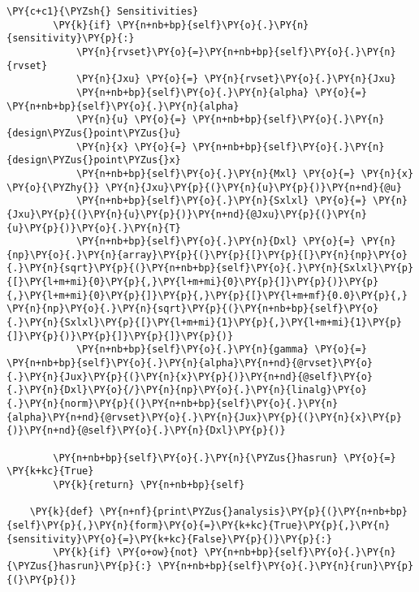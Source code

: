 \begin{tcolorbox}[breakable, size=fbox, boxrule=1pt, pad at break*=1mm,colback=cellbackground, colframe=cellborder]
\begin{Verbatim}[commandchars=\\\{\}]
        \PY{c+c1}{\PYZsh{} Sensitivities}
        \PY{k}{if} \PY{n+nb+bp}{self}\PY{o}{.}\PY{n}{sensitivity}\PY{p}{:}
            \PY{n}{rvset}\PY{o}{=}\PY{n+nb+bp}{self}\PY{o}{.}\PY{n}{rvset}
            \PY{n}{Jxu} \PY{o}{=} \PY{n}{rvset}\PY{o}{.}\PY{n}{Jxu}
            \PY{n+nb+bp}{self}\PY{o}{.}\PY{n}{alpha} \PY{o}{=} \PY{n+nb+bp}{self}\PY{o}{.}\PY{n}{alpha}
            \PY{n}{u} \PY{o}{=} \PY{n+nb+bp}{self}\PY{o}{.}\PY{n}{design\PYZus{}point\PYZus{}u} 
            \PY{n}{x} \PY{o}{=} \PY{n+nb+bp}{self}\PY{o}{.}\PY{n}{design\PYZus{}point\PYZus{}x}
            \PY{n+nb+bp}{self}\PY{o}{.}\PY{n}{Mxl} \PY{o}{=} \PY{n}{x} \PY{o}{\PYZhy{}} \PY{n}{Jxu}\PY{p}{(}\PY{n}{u}\PY{p}{)}\PY{n+nd}{@u}
            \PY{n+nb+bp}{self}\PY{o}{.}\PY{n}{Sxlxl} \PY{o}{=} \PY{n}{Jxu}\PY{p}{(}\PY{n}{u}\PY{p}{)}\PY{n+nd}{@Jxu}\PY{p}{(}\PY{n}{u}\PY{p}{)}\PY{o}{.}\PY{n}{T}
            \PY{n+nb+bp}{self}\PY{o}{.}\PY{n}{Dxl} \PY{o}{=} \PY{n}{np}\PY{o}{.}\PY{n}{array}\PY{p}{(}\PY{p}{[}\PY{p}{[}\PY{n}{np}\PY{o}{.}\PY{n}{sqrt}\PY{p}{(}\PY{n+nb+bp}{self}\PY{o}{.}\PY{n}{Sxlxl}\PY{p}{[}\PY{l+m+mi}{0}\PY{p}{,}\PY{l+m+mi}{0}\PY{p}{]}\PY{p}{)}\PY{p}{,}\PY{l+m+mi}{0}\PY{p}{]}\PY{p}{,}\PY{p}{[}\PY{l+m+mf}{0.0}\PY{p}{,} \PY{n}{np}\PY{o}{.}\PY{n}{sqrt}\PY{p}{(}\PY{n+nb+bp}{self}\PY{o}{.}\PY{n}{Sxlxl}\PY{p}{[}\PY{l+m+mi}{1}\PY{p}{,}\PY{l+m+mi}{1}\PY{p}{]}\PY{p}{)}\PY{p}{]}\PY{p}{]}\PY{p}{)}
            \PY{n+nb+bp}{self}\PY{o}{.}\PY{n}{gamma} \PY{o}{=} \PY{n+nb+bp}{self}\PY{o}{.}\PY{n}{alpha}\PY{n+nd}{@rvset}\PY{o}{.}\PY{n}{Jux}\PY{p}{(}\PY{n}{x}\PY{p}{)}\PY{n+nd}{@self}\PY{o}{.}\PY{n}{Dxl}\PY{o}{/}\PY{n}{np}\PY{o}{.}\PY{n}{linalg}\PY{o}{.}\PY{n}{norm}\PY{p}{(}\PY{n+nb+bp}{self}\PY{o}{.}\PY{n}{alpha}\PY{n+nd}{@rvset}\PY{o}{.}\PY{n}{Jux}\PY{p}{(}\PY{n}{x}\PY{p}{)}\PY{n+nd}{@self}\PY{o}{.}\PY{n}{Dxl}\PY{p}{)}
        
        \PY{n+nb+bp}{self}\PY{o}{.}\PY{n}{\PYZus{}hasrun} \PY{o}{=} \PY{k+kc}{True}
        \PY{k}{return} \PY{n+nb+bp}{self}

    \PY{k}{def} \PY{n+nf}{print\PYZus{}analysis}\PY{p}{(}\PY{n+nb+bp}{self}\PY{p}{,}\PY{n}{form}\PY{o}{=}\PY{k+kc}{True}\PY{p}{,}\PY{n}{sensitivity}\PY{o}{=}\PY{k+kc}{False}\PY{p}{)}\PY{p}{:}
        \PY{k}{if} \PY{o+ow}{not} \PY{n+nb+bp}{self}\PY{o}{.}\PY{n}{\PYZus{}hasrun}\PY{p}{:} \PY{n+nb+bp}{self}\PY{o}{.}\PY{n}{run}\PY{p}{(}\PY{p}{)}


\end{Verbatim}
\end{tcolorbox}
